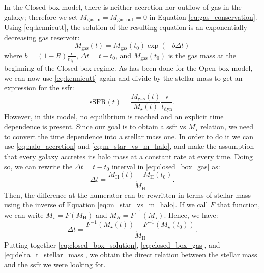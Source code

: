 \documentclass[fleqn, usenatbib]{mnras}
\begin{document}
In the Closed-box model, there is neither accretion nor outflow of gas in the galaxy; therefore we set \(\dot{M}_{\mathrm{gas, in}} = \dot{M}_{\mathrm{gas, out}} = 0\) in Equation \ref{eq:gas_conservation}. Using \eqref{eq:kennicutt}, the solution of the resulting equation is an exponentially decreasing gas reservoir:
\begin{equation} \label{eq:closed_box_gas}
	M_{\mathrm{gas}}(t) = M_{\mathrm{gas}}(t_0) \exp(-b \Delta t)
\end{equation}
where \(b = (1 - R) \frac{\epsilon}{t_{\mathrm{dyn}}}\), \(\Delta t = t - t_0\), and \(M_{\mathrm{gas}}(t_0)\) is the gas mass at the beginning of the Closed-box regime. As has been done for the Open-box model, we can now use \eqref{eq:kennicutt} again and divide by the stellar mass to get an expression for the \acrshort{ssfr}:
\begin{equation} \label{eq:closed_box_solution}
	\mathrm{sSFR}(t) = \frac{M_{\mathrm{gas}}(t)}{M_{\star}(t)} \frac{\epsilon}{t_{\mathrm{dyn}}}.
\end{equation}
However, in this model, no equilibrium is reached and an explicit time dependence is present. Since our goal is to obtain a \acrshort{ssfr} vs \(M_{\star}\) relation, we need to convert the time dependence into a stellar mass one. In order to do it we can use \eqref{eq:halo_accretion} and \eqref{eq:m_star_vs_m_halo}, and make the assumption that every galaxy accretes its halo mass at a constant rate at every time. Doing so, we can rewrite the \(\Delta t = t - t_0\) interval in \eqref{eq:closed_box_gas} as:
\begin{equation} \label{eq:delta_t_halo_mass}
	\Delta t = \frac{M_{\mathrm{H}}(t) - M_{\mathrm{H}}(t_0)}{\dot{M}_{\mathrm{H}}}.
\end{equation}
Then, the difference at the numerator can be rewritten in terms of stellar mass using the inverse of Equation \ref{eq:m_star_vs_m_halo}. If we call \(F\) that function, we can write \(M_{\star} = F(M_{\mathrm{H}})\) and \(M_{H} = F^{-1}(M_{\mathrm{\star}})\). Hence, we have:
\begin{equation} \label{eq:delta_t_stellar_mass}
	\Delta t = \frac{F^{-1}(M_{\mathrm{\star}}(t)) - F^{-1}(M_{\mathrm{\star}}(t_0))}{\dot{M}_{\mathrm{H}}}.
\end{equation}
Putting together \eqref{eq:closed_box_solution}, \eqref{eq:closed_box_gas}, and \eqref{eq:delta_t_stellar_mass}, we obtain the direct relation between the stellar mass and the \acrlong{ssfr} we were looking for.
\end{document}
